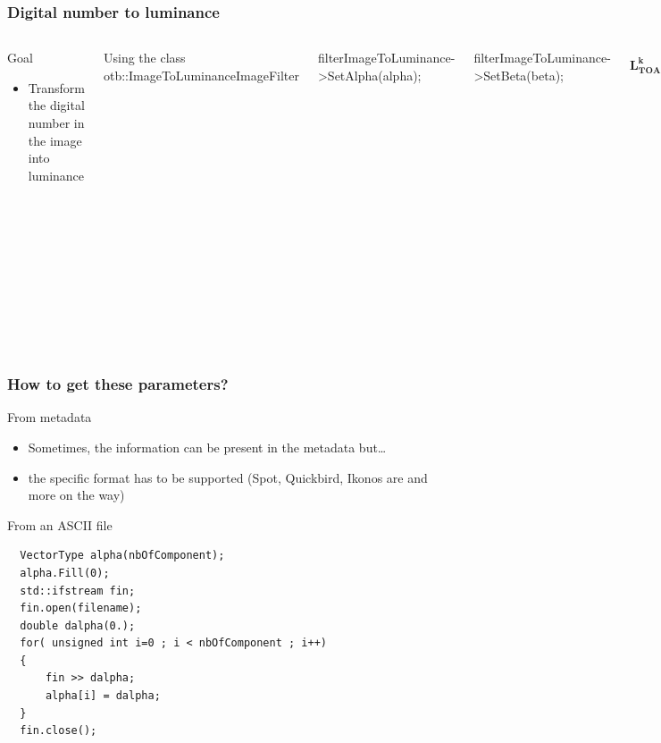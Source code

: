 \documentclass[compress]{beamer}
\begin{document}
\begin{frame}

  \frametitle{Digital number to luminance}
     \begin{columns}

  \begin{block}{Goal}
   \begin{itemize}
    \item Transform the digital number in the image into luminance
   \end{itemize}
  \end{block}
  Using the class otb::ImageToLuminanceImageFilter

  filterImageToLuminance->SetAlpha(alpha);

  filterImageToLuminance->SetBeta(beta);

  \footnotesize
  \begin{equation*}
   \mathbf{L_{TOA}^{k}} = \frac{ X^{k} } { \alpha_{k} } + \beta_{k}
  \end{equation*}
  \begin{itemize}
  \item $\mathbf{L_{TOA}^{k}}$ is the incident luminance (in
  $W.m^{-2}.sr^{-1}.\mu m^{-1}$)
  \item $\mathbf{X^{k}}$  digital number
  \item $\alpha_{k}$ absolute calibration gain for channel k
  \item $\beta_{k}$ absolute calibration bias for channel k
  \end{itemize}

  \end{columns}
\end{frame}

\begin{frame}[fragile]
  \frametitle{How to get these parameters?}
  \begin{block}{From metadata}
   \begin{itemize}
    \footnotesize
    \item Sometimes, the information can be present in the metadata but\ldots
    \item the specific format has to be supported (Spot, Quickbird,
          Ikonos are and more on the way)
   \end{itemize}
  \end{block}
  \begin{block}{From an ASCII file}
  \footnotesize
  \begin{verbatim}
  VectorType alpha(nbOfComponent);
  alpha.Fill(0);
  std::ifstream fin;
  fin.open(filename);
  double dalpha(0.);
  for( unsigned int i=0 ; i < nbOfComponent ; i++)
  {
      fin >> dalpha;
      alpha[i] = dalpha;
  }
  fin.close();
  \end{verbatim}
  \end{block}
\end{frame}
\end{document}

